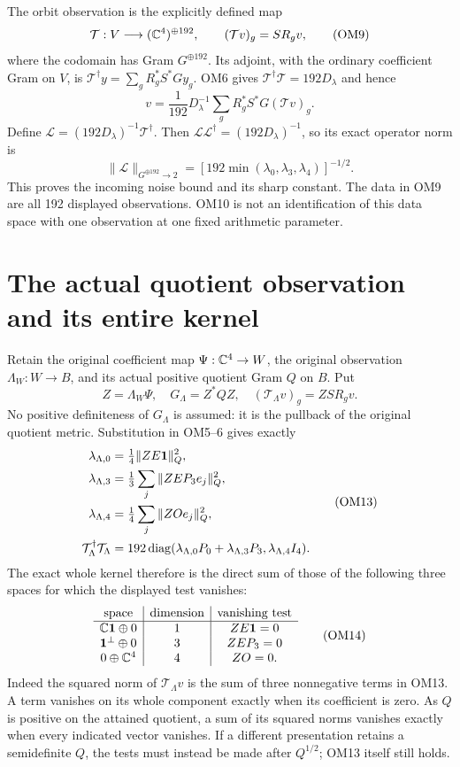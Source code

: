 \documentclass[11pt]{article}
\begin{document}
The orbit observation is the explicitly defined map
\[
\mathcal T:V\longrightarrow(\mathbb C^4)^{\oplus192},\qquad
(\mathcal Tv)_g=S R_gv,
\tag{OM9}
\]
where the codomain has Gram $G^{\oplus192}$.  Its adjoint, with the
ordinary coefficient Gram on $V$, is
$\mathcal T^\dagger y=\sum_g R_g^*S^*G y_g$.
OM6 gives $\mathcal T^\dagger\mathcal T=192D_\lambda$ and hence
\[
v=\frac1{192}D_\lambda^{-1}\sum_gR_g^*S^*G(\mathcal Tv)_g.
\tag{OM10}
\]
Define $\mathcal L=(192D_\lambda)^{-1}\mathcal T^\dagger$.
Then
$\mathcal L\mathcal L^\dagger=(192D_\lambda)^{-1}$, so its exact
operator norm is
\[
\|\mathcal L\|_{G^{\oplus192}\to2}
=[192\min(\lambda_0,\lambda_3,\lambda_4)]^{-1/2}.
\tag{OM11}
\]
This proves the incoming noise bound and its sharp constant.
The data in OM9 are all 192 displayed observations.  OM10 is not
an identification of this data space with one observation at one
fixed arithmetic parameter.

\section{The actual quotient observation and its entire kernel}
Retain the original coefficient map $\Psi:\mathbb C^4\to W$, the original
observation $\Lambda_W:W\to B$, and its actual positive quotient
Gram $Q$ on $B$.  Put
\[
Z=\Lambda_W\Psi,\quad G_\Lambda=Z^*QZ,\quad
(\mathcal T_\Lambda v)_g=ZS R_gv.
\tag{OM12}
\]
No positive definiteness of $G_\Lambda$ is assumed: it is the
pullback of the original quotient metric.  Substitution in OM5--6
gives exactly
\[
\begin{split}
\lambda_{\Lambda,0}&=\tfrac14\|ZE\mathbf 1\|_Q^2,\\
\lambda_{\Lambda,3}&=\tfrac13\sum_j\|ZE P_3e_j\|_Q^2,\\
\lambda_{\Lambda,4}&=\tfrac14\sum_j\|ZO e_j\|_Q^2,\\
\mathcal T_\Lambda^\dagger\mathcal T_\Lambda
&=192\operatorname{diag}(\lambda_{\Lambda,0}P_0+
\lambda_{\Lambda,3}P_3,\lambda_{\Lambda,4}I_4).
\end{split}\tag{OM13}
\]
The exact whole kernel therefore is the direct sum of those of the
following three spaces for which the displayed test vanishes:
\[
\begin{array}{c|c|c}
\text{space}&\text{dimension}&\text{vanishing test}\\ \hline
\mathbb C\mathbf 1\oplus0&1&ZE\mathbf 1=0\\
\mathbf 1^\perp\oplus0&3&ZE P_3=0\\
0\oplus\mathbb C^4&4&ZO=0 .
\end{array}\tag{OM14}
\]
Indeed the squared norm of $\mathcal T_\Lambda v$ is the sum of
three nonnegative terms in OM13.  A term vanishes on its whole
component exactly when its coefficient is zero.  As $Q$ is
positive on the attained quotient, a sum of its squared norms
vanishes exactly when every indicated vector vanishes.
If a different presentation retains a semidefinite $Q$, the tests
must instead be made after $Q^{1/2}$; OM13 itself still holds.
\end{document}
